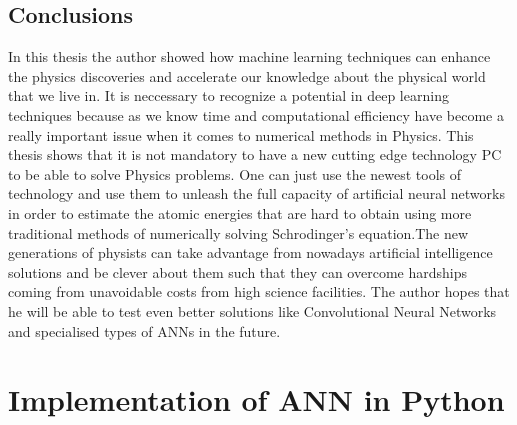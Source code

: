 \documentclass[a4paper,oneside,openright,11pt]{book}
\begin{document}
\section{Conclusions}

In this thesis the author showed how machine learning techniques can enhance the physics discoveries and accelerate our knowledge about the physical world that we live in. It is neccessary to recognize a potential in deep learning techniques because as we know time and computational efficiency have become a really important issue when it comes to numerical methods in Physics. This thesis shows that it is not mandatory to have a new cutting edge technology PC to be able to solve Physics problems. One can just use the newest tools of technology and use them to unleash the full capacity of artificial neural networks in order to estimate the atomic energies that are hard to obtain using more  traditional methods of numerically solving Schrodinger's equation.The new generations of physists can take advantage from nowadays artificial intelligence solutions and be clever about them such that they can overcome hardships coming from unavoidable costs from high science facilities. The author hopes that he will be able to test even better solutions like Convolutional Neural Networks and specialised types of ANNs in the future.





\appendix
\appendixpage
\addappheadtotoc
\chapter{Implementation of ANN in Python}
\end{document}
